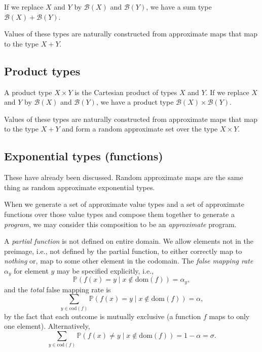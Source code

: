 \documentclass[11pt,final,hidelinks]{article}
\renewcommand{\P}{\mathbb{P}}      %
\newcommand{\FPR}{\alpha}          %
\newcommand{\TNR}{\sigma}          %
\newcommand{\dom}{\mathrm{dom}}    %
\newcommand{\cod}{\mathrm{cod}}    %
\newcommand{\Ber}[1]{\mathcal{B}(#1)}  %
\theoremstyle{plain}
\begin{document}
If we replace $X$ and $Y$ by $\Ber{X}$ and $\Ber{Y}$, we have a sum type $\Ber{X} + \Ber{Y}$.

Values of these types are naturally constructed from approximate maps that map to the type $X+Y$.

\subsection{Product types}

A product type $X \times Y$ is the Cartesian product of types $X$ and $Y$.
If we replace $X$ and $Y$ by $\Ber{X}$ and $\Ber{Y}$, we have a product type $\Ber{X} \times \Ber{Y}$.

Values of these types are naturally constructed from approximate maps that map to the type $X+Y$ and form a random approximate set over the type $X \times Y$.

\subsection{Exponential types (functions)}

These have already been discussed.
Random approximate maps are the same thing as random approximate exponential types.

When we generate a set of approximate value types and a set of approximate functions over those value types and compose them together to generate a \emph{program}, we may consider this composition to be an \emph{approximate} program.

A \emph{partial function} is not defined on entire domain.
We allow elements not in the preimage, i.e., not defined by the partial function, to either correctly map to \emph{nothing} or, map to some other element in the codomain.
The \emph{false mapping rate} $\FPR_{y}$ for element $y$ may be specified explicitly, i.e.,
\begin{equation}
\P(f(x) = y \mid x \notin \dom(f)) = \FPR_{y},
\end{equation}
and the \emph{total} false mapping rate is
\begin{equation}
\sum_{y \in \cod(f)} \P(f(x) = y \mid x \notin \dom(f)) = \FPR,
\end{equation}
by the fact that each outcome is mutually exclusive (a function $f$ maps to only one element).
Alternatively,
\begin{equation}
\sum_{y \in \cod(f)} \P(f(x) \neq y \mid x \notin \dom(f)) = 1-\FPR = \TNR.
\end{equation}
\end{document}
